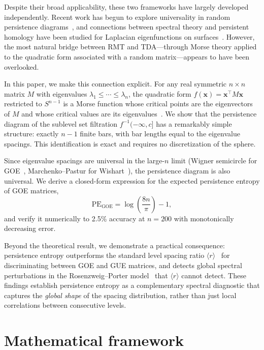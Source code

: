 \documentclass[aps,pre,twocolumn,superscriptaddress,showpacs]{revtex4-2}
\begin{document}
Despite their broad applicability, these two frameworks have largely developed independently. Recent work has begun to explore universality in random persistence diagrams~\cite{bobrowski2024,divol2019}, and connections between spectral theory and persistent homology have been studied for Laplacian eigenfunctions on surfaces~\cite{polterovich2019}. However, the most natural bridge between RMT and TDA---through Morse theory applied to the quadratic form associated with a random matrix---appears to have been overlooked.

In this paper, we make this connection explicit. For any real symmetric $n \times n$ matrix $M$ with eigenvalues $\lambda_1 \le \cdots \le \lambda_n$, the quadratic form $f(\mathbf{x}) = \mathbf{x}^\top M \mathbf{x}$ restricted to $S^{n-1}$ is a Morse function whose critical points are the eigenvectors of $M$ and whose critical values are its eigenvalues~\cite{milnor1963}. We show that the persistence diagram of the sublevel set filtration $f^{-1}(-\infty, c]$ has a remarkably simple structure: exactly $n - 1$ finite bars, with bar lengths equal to the eigenvalue spacings. This identification is exact and requires no discretization of the sphere.

Since eigenvalue spacings are universal in the large-$n$ limit (Wigner semicircle for GOE~\cite{wigner1955}, Marchenko--Pastur for Wishart~\cite{marchenko1967}), the persistence diagram is also universal. We derive a closed-form expression for the expected persistence entropy of GOE matrices,
\begin{equation}
\mathrm{PE}_{\mathrm{GOE}} = \log\!\left(\frac{8n}{\pi}\right) - 1,
\label{eq:pe_goe}
\end{equation}
and verify it numerically to 2.5\% accuracy at $n = 200$ with monotonically decreasing error.

Beyond the theoretical result, we demonstrate a practical consequence: persistence entropy outperforms the standard level spacing ratio $\langle r \rangle$~\cite{atas2013} for discriminating between GOE and GUE matrices, and detects global spectral perturbations in the Rosenzweig--Porter model~\cite{rosenzweig1960} that $\langle r \rangle$ cannot detect. These findings establish persistence entropy as a complementary spectral diagnostic that captures the \textit{global shape} of the spacing distribution, rather than just local correlations between consecutive levels.

\section{Mathematical framework}
\label{sec:framework}
\end{document}
